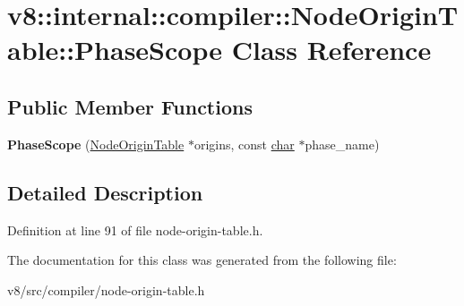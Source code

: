 \hypertarget{classv8_1_1internal_1_1compiler_1_1NodeOriginTable_1_1PhaseScope}{}\section{v8\+:\+:internal\+:\+:compiler\+:\+:Node\+Origin\+Table\+:\+:Phase\+Scope Class Reference}
\label{classv8_1_1internal_1_1compiler_1_1NodeOriginTable_1_1PhaseScope}
\subsection*{Public Member Functions}
\begin{DoxyCompactItemize}
\item 
\mbox{\label{classv8_1_1internal_1_1compiler_1_1NodeOriginTable_1_1PhaseScope_af057cb56dd2137d93150acc4204c0967}} 
{\bfseries Phase\+Scope} (\mbox{\hyperlink{classv8_1_1internal_1_1compiler_1_1NodeOriginTable}{Node\+Origin\+Table}} $\ast$origins, const \mbox{\hyperlink{classchar}{char}} $\ast$phase\+\_\+name)
\end{DoxyCompactItemize}


\subsection{Detailed Description}


Definition at line 91 of file node-\/origin-\/table.\+h.



The documentation for this class was generated from the following file\+:\begin{DoxyCompactItemize}
\item 
v8/src/compiler/node-\/origin-\/table.\+h\end{DoxyCompactItemize}
